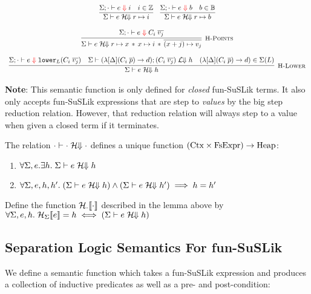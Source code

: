 \documentclass[10pt]{article}
\begin{document}
\[
  \begin{array}{c}
    \infer{\Sigma \vdash e \Hbigs r \pointsto i}{\Sigma ; \cdot \vdash e \bigs\; i & i \in \mathbb{Z}}
    ~~~
    \infer{\Sigma \vdash e \Hbigs r \pointsto b}{\Sigma ; \cdot \vdash e \bigs\; b & b \in \mathbb{B}}
    \\\\
    \labinfer[H-Points]{\Sigma \vdash e \Hbigs r \pointsto x \sep x \pointsto i \sep \overline{(x+j) \pointsto v_j}}{\Sigma ; \cdot \vdash e \bigs\; C_i\; \overline{v_j}}
    \\\\
    \labinfer[H-Lower]{\Sigma \vdash e \Hbigs h}
      {\Sigma; \cdot \vdash e \bigs\; \lowerS{L} (C_i\; \overline{v_j})
      & \Sigma \vdash (\lambda[\Delta] (C_i\; \overline{p}) \ra d); (C_i\; \overline{v_j}) \Lbigs h
      & (\lambda[\Delta] (C_i\; \overline{p}) \ra d) \in \Sigma(L)
      }
  \end{array}
\]

\noindent
\textbf{Note}: This semantic function is only defined for \textit{closed} fun-SuSLik terms. It also only
accepts fun-SuSLik expressions that are step to \textit{values} by the big step reduction relation. However,
that reduction relation will always step to a value when given a closed term if it terminates.

\begin{lemma}
  The relation $\cdot \vdash \cdot \;\mathcal{H}\!\!\Downarrow \cdot$ defines a unique function $(\textnormal{Ctx} \times \textnormal{FsExpr}) \rightarrow \textnormal{Heap}$:
  \begin{enumerate}
    \item $\forall \Sigma, e. \exists h.\; \Sigma \vdash e \;\mathcal{H}\!\!\Downarrow h$
    \item $\forall \Sigma, e, h, h'.\; (\Sigma \vdash e \;\mathcal{H}\!\!\Downarrow h) \land (\Sigma \vdash e \;\mathcal{H}\!\!\Downarrow h') \implies h = h'$
  \end{enumerate}
\end{lemma}

\begin{definition}
  Define the function $\mathcal{H}_{\cdot}\llbracket\cdot\rrbracket$ described in the lemma above by\\
  $\forall \Sigma, e, h.\; \mathcal{H}_{\Sigma}\llbracket e\rrbracket = h \iff (\Sigma \vdash e \;\mathcal{H}\!\!\Downarrow h)$
\end{definition}

\subsection{Separation Logic Semantics For fun-SuSLik}
We define a semantic function which takes a fun-SuSLik expression and produces a collection
of inductive predicates as well as a pre- and post-condition:
\end{document}
